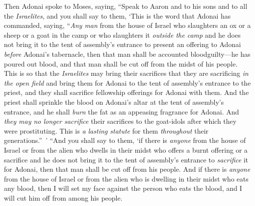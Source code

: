 \begin{biblechapter} %
 Then Adonai spoke to Moses, saying,
\verse “Speak to Aaron and to his sons and to all the \textit{Israelites}, and you shall say to them, ‘This is the word that Adonai has commanded, saying,
\verse “\textit{Any man} from the house of Israel who slaughters an ox or a sheep or a goat in the camp or who slaughters it \textit{outside the camp}
\verse and he does not bring it to the tent of assembly’s entrance to present an offering to Adonai \textit{before} Adonai’s tabernacle, then that man shall be accounted bloodguilty—he has poured out blood, and that man shall be cut off from the midst of his people.
\verse This is so that the \textit{Israelites} may bring their sacrifices that they are sacrificing \textit{in the open field} and bring them for Adonai to the tent of assembly’s entrance to the priest, and they shall sacrifice fellowship offerings for Adonai with them.
\verse And the priest shall sprinkle the blood on Adonai’s altar at the tent of assembly’s entrance, and he shall \textit{burn} the fat as an appeasing fragrance for Adonai.
\verse And \textit{they may no longer sacrifice} their sacrifices to the goat-idols after which they were prostituting. This is \textit{a lasting statute} for them \textit{throughout} their generations.” ’
 “And you shall say to them, ‘if there is \textit{anyone} from the house of Israel or from the alien who dwells in their midst who offers a burnt offering or a sacrifice
\verse and he does not bring it to the tent of assembly’s entrance to \textit{sacrifice} it for Adonai, then that man shall be cut off from his people.
\verse And if there is \textit{anyone} from the house of Israel or from the alien who is dwelling in their midst who eats any blood, then I will set my face against the person who eats the blood, and I will cut him off from among his people.

\end{biblechapter}

